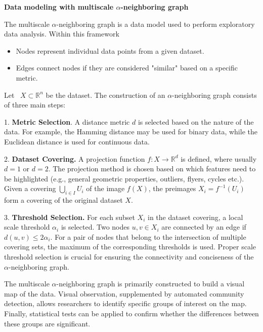 \documentclass[12pt,a4]{article}
\begin{document}
\textbf{Data modeling with multiscale $\alpha$-neighboring graph }



The multiscale $\alpha $-neighboring graph is a data model used to perform exploratory data analysis. Within this framework
\begin{itemize}
\item Nodes represent individual data points from a given dataset.
\item Edges connect nodes if they are considered "similar" based on a specific metric.
\end{itemize}



Let \ $\displaystyle X\subset \mathbb{R}^{n}$ be the dataset. The construction of an $\alpha $-neighboring graph consists of three main steps:



1. \textbf{Metric Selection}. A distance metric $d$ is selected based on the nature of the data. For example, the Hamming distance may be used for binary data, while the Euclidean distance is used for continuous data.



2. \textbf{Dataset Covering. }A projection function $f:X\rightarrow \mathbb{R}^{d}$ is defined, where usually $d=1$ or $d=2$. The projection method is chosen based on which features need to be highlighted (e.g., general geometric properties, outliers, flyers, cycles etc.). Given a covering $\bigcup _{i\in I} U_{i}$ of the image $f(X)$, the preimages $X_{i} =f^{-1} (U_{i} )$ form a covering of the original dataset $X$.



3. \textbf{Threshold Selection. }For each subset $X_{i}$ in the dataset covering, a local scale threshold $\alpha _{i}$ is selected. Two nodes $u,v\in X_{i}$ are connected by an edge if $d(u,v)\leq 2\alpha _{i}$. For a pair of nodes that belong to the intersection of multiple covering sets, the maximum of the corresponding thresholds is used. Proper scale threshold selection is crucial for ensuring the connectivity and conciseness of the $\alpha $-neighboring graph.



The multiscale $\alpha$-neighboring graph is primarily constructed to build a visual map of the data. Visual observation, supplemented by automated community detection, allows researchers to identify specific groups of interest on the map. Finally, statistical tests can be applied to confirm whether the differences between these groups are significant.
\end{document}
